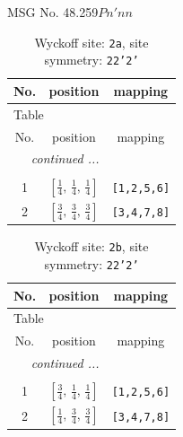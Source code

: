 \documentclass[fleqn,8pt]{jsarticle}
\begin{document}
\setcounter{MaxMatrixCols}{32}

\renewcommand{\tablename}{Table~}
\renewcommand{\figurename}{Figure~}
\begin{center}
\LARGE
MSG No. 48.259\quad$Pn'nn$
\end{center}
\renewcommand{\arraystretch}{1.2}
\begin{longtable}{ccc}
\caption{Wyckoff site: {\tt 2a}, site symmetry: {\tt 22'2'}}
 \\
 \hline \hline
No. & position & mapping \\ \hline \endfirsthead

\multicolumn{2}{l}{\tablename\ \thetable{}} \\
 \hline \hline
No. & position & mapping \\ \hline \endhead

 \hline \hline
\multicolumn{2}{r}{\footnotesize\it continued ...} \\ \endfoot

 \hline \hline
\multicolumn{2}{r}{} \\ \endlastfoot

1 & $\left[ \frac{1}{4},\, \frac{1}{4},\, \frac{1}{4} \right]$ & {\tt [1,2,5,6]} \\ \hline
2 & $\left[ \frac{3}{4},\, \frac{3}{4},\, \frac{3}{4} \right]$ & {\tt [3,4,7,8]} \\
\end{longtable}
\renewcommand{\arraystretch}{1.2}
\begin{longtable}{ccc}
\caption{Wyckoff site: {\tt 2b}, site symmetry: {\tt 22'2'}}
 \\
 \hline \hline
No. & position & mapping \\ \hline \endfirsthead

\multicolumn{2}{l}{\tablename\ \thetable{}} \\
 \hline \hline
No. & position & mapping \\ \hline \endhead

 \hline \hline
\multicolumn{2}{r}{\footnotesize\it continued ...} \\ \endfoot

 \hline \hline
\multicolumn{2}{r}{} \\ \endlastfoot

1 & $\left[ \frac{3}{4},\, \frac{1}{4},\, \frac{1}{4} \right]$ & {\tt [1,2,5,6]} \\ \hline
2 & $\left[ \frac{1}{4},\, \frac{3}{4},\, \frac{3}{4} \right]$ & {\tt [3,4,7,8]} \\
\end{longtable}
\end{document}
